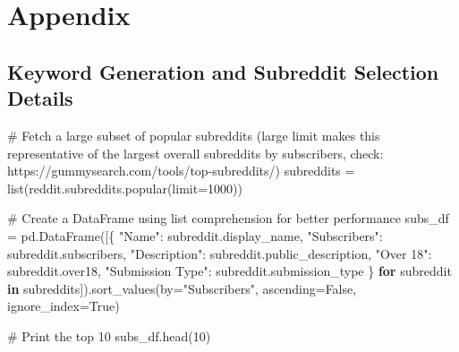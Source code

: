 \documentclass[
  12pt,
  letterpaper,
  DIV=11,
  numbers=noendperiod,
  abstract]{scrartcl}
\newenvironment{Shaded}{\begin{snugshade}}{\end{snugshade}}
\newcommand{\BuiltInTok}[1]{\textcolor[rgb]{0.00,0.23,0.31}{#1}}
\newcommand{\CommentTok}[1]{\textcolor[rgb]{0.37,0.37,0.37}{#1}}
\newcommand{\ControlFlowTok}[1]{\textcolor[rgb]{0.00,0.23,0.31}{\textbf{#1}}}
\newcommand{\DecValTok}[1]{\textcolor[rgb]{0.68,0.00,0.00}{#1}}
\newcommand{\KeywordTok}[1]{\textcolor[rgb]{0.00,0.23,0.31}{\textbf{#1}}}
\newcommand{\NormalTok}[1]{\textcolor[rgb]{0.00,0.23,0.31}{#1}}
\newcommand{\OperatorTok}[1]{\textcolor[rgb]{0.37,0.37,0.37}{#1}}
\newcommand{\StringTok}[1]{\textcolor[rgb]{0.13,0.47,0.30}{#1}}
\newcommand{\VariableTok}[1]{\textcolor[rgb]{0.07,0.07,0.07}{#1}}
\begin{document}
\newpage

\section*{Appendix}\label{appendix}

\subsection*{Keyword Generation and Subreddit Selection
Details}\label{keyword-generation-and-subreddit-selection-details}

\begin{Shaded}
\begin{Highlighting}[]
\CommentTok{\# Fetch a large subset of popular subreddits (large limit makes this representative of the largest overall subreddits by subscribers, check: https://gummysearch.com/tools/top{-}subreddits/)}
\NormalTok{subreddits }\OperatorTok{=} \BuiltInTok{list}\NormalTok{(reddit.subreddits.popular(limit}\OperatorTok{=}\DecValTok{1000}\NormalTok{))}

\CommentTok{\# Create a DataFrame using list comprehension for better performance}
\NormalTok{subs\_df }\OperatorTok{=}\NormalTok{ pd.DataFrame([\{}
    \StringTok{"Name"}\NormalTok{: subreddit.display\_name,}
    \StringTok{"Subscribers"}\NormalTok{: subreddit.subscribers,}
    \StringTok{"Description"}\NormalTok{: subreddit.public\_description,}
    \StringTok{"Over 18"}\NormalTok{: subreddit.over18,}
    \StringTok{"Submission Type"}\NormalTok{: subreddit.submission\_type}
\NormalTok{\} }\ControlFlowTok{for}\NormalTok{ subreddit }\KeywordTok{in}\NormalTok{ subreddits]).sort\_values(by}\OperatorTok{=}\StringTok{"Subscribers"}\NormalTok{, ascending}\OperatorTok{=}\VariableTok{False}\NormalTok{, ignore\_index}\OperatorTok{=}\VariableTok{True}\NormalTok{)}

\CommentTok{\# Print the top 10}
\NormalTok{subs\_df.head(}\DecValTok{10}\NormalTok{)}
\end{Highlighting}
\end{Shaded}
\end{document}
